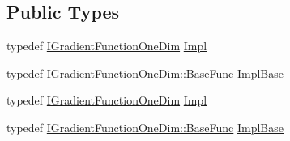 \subsection*{Public Types}
\begin{DoxyCompactItemize}
\item 
typedef \mbox{\hyperlink{classROOT_1_1Math_1_1IGradientFunctionOneDim}{I\+Gradient\+Function\+One\+Dim}} \mbox{\hyperlink{classROOT_1_1Math_1_1GradFunctor1D_a76566ff5310b5900b8df38e0884b3210}{Impl}}
\item 
typedef \mbox{\hyperlink{classROOT_1_1Math_1_1IGradientFunctionOneDim_a9eae6bcbeb2d0396937710bd70bd29d0}{I\+Gradient\+Function\+One\+Dim\+::\+Base\+Func}} \mbox{\hyperlink{classROOT_1_1Math_1_1GradFunctor1D_a16b436a0d100aa6c16ee66961c4f5b97}{Impl\+Base}}
\item 
typedef \mbox{\hyperlink{classROOT_1_1Math_1_1IGradientFunctionOneDim}{I\+Gradient\+Function\+One\+Dim}} \mbox{\hyperlink{classROOT_1_1Math_1_1GradFunctor1D_a76566ff5310b5900b8df38e0884b3210}{Impl}}
\item 
typedef \mbox{\hyperlink{classROOT_1_1Math_1_1IGradientFunctionOneDim_a9eae6bcbeb2d0396937710bd70bd29d0}{I\+Gradient\+Function\+One\+Dim\+::\+Base\+Func}} \mbox{\hyperlink{classROOT_1_1Math_1_1GradFunctor1D_a16b436a0d100aa6c16ee66961c4f5b97}{Impl\+Base}}
\end{DoxyCompactItemize}
